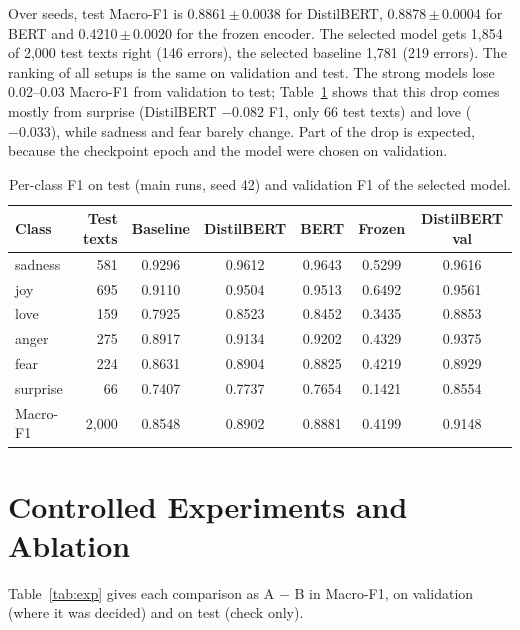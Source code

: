 \documentclass[11pt,a4paper]{article}
\newcommand{\pmstd}[2]{#1\,$\pm$\,#2}
\begin{document}
Over seeds, test Macro-F1 is \pmstd{0.8861}{0.0038} for DistilBERT, \pmstd{0.8878}{0.0004} for BERT and \pmstd{0.4210}{0.0020} for the frozen encoder. The selected model gets 1,854 of 2,000 test texts right (146 errors), the selected baseline 1,781 (219 errors). The ranking of all setups is the same on validation and test. The strong models lose 0.02--0.03 Macro-F1 from validation to test; Table~\ref{tab:perclass} shows that this drop comes mostly from surprise (DistilBERT $-0.082$ F1, only 66 test texts) and love ($-0.033$), while sadness and fear barely change. Part of the drop is expected, because the checkpoint epoch and the model were chosen on validation.

\begin{table}[H]
\centering
\caption{Per-class F1 on test (main runs, seed 42) and validation F1 of the selected model.}
\label{tab:perclass}
\begin{tabular}{@{}lrccccc@{}}
\toprule
\textbf{Class} & \textbf{Test texts} & \textbf{Baseline} & \textbf{DistilBERT} & \textbf{BERT} & \textbf{Frozen} & \textbf{DistilBERT val}\\
\midrule
sadness & 581 & 0.9296 & 0.9612 & 0.9643 & 0.5299 & 0.9616\\
joy & 695 & 0.9110 & 0.9504 & 0.9513 & 0.6492 & 0.9561\\
love & 159 & 0.7925 & 0.8523 & 0.8452 & 0.3435 & 0.8853\\
anger & 275 & 0.8917 & 0.9134 & 0.9202 & 0.4329 & 0.9375\\
fear & 224 & 0.8631 & 0.8904 & 0.8825 & 0.4219 & 0.8929\\
surprise & 66 & 0.7407 & 0.7737 & 0.7654 & 0.1421 & 0.8554\\
\midrule
Macro-F1 & 2,000 & 0.8548 & 0.8902 & 0.8881 & 0.4199 & 0.9148\\
\bottomrule
\end{tabular}
\end{table}

\section{Controlled Experiments and Ablation}
\label{sec:exp}
Table~\ref{tab:exp} gives each comparison as A $-$ B in Macro-F1, on validation (where it was decided) and on test (check only).
\end{document}
